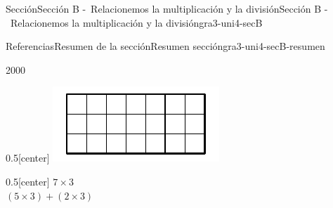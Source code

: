 \documentclass[twoside,10pt,]{article}
\begin{document}
\begin{sectionptx}{Sección}{Sección B -~Relacionemos la multiplicación y la división}{}{Sección B -~Relacionemos la multiplicación y la división}{}{}{gra3-uni4-secB}
\begin{references-subsection}{Referencias}{Resumen de la sección}{}{Resumen sección}{}{}{gra3-uni4-secB-resumen}
\begin{sidebyside}{2}{0}{0}{0}
\begin{sbspanel}{0.5}[center]
\includegraphics[width=\linewidth]{external/svg-source/tikz-file-141807.pdf}
\end{sbspanel}%
\begin{sbspanel}{0.5}[center]%
\(7\times 3\)\\
 \((5\times3)+(2\times3)\)%
\end{sbspanel}%
\end{sidebyside}%
\end{references-subsection}
\end{sectionptx}
%
%
\typeout{************************************************}
\typeout{************************************************}
%
\end{document}
